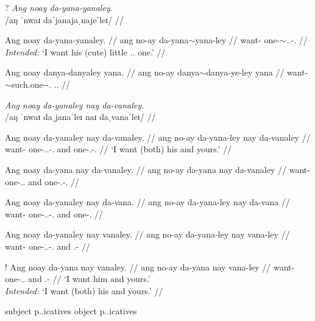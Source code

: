 \documentclass[12pt,a4paper]{scrartcl}
\newcommand{\PargI}{{\Parg}.{\Inan}}
\newcommand{\TsgM}{{\Tsg}.{\M}}
\newcommand{\til}{$\sim$} %
\begin{document}
\pex
\a\ljudge?\begingl
\glpreamble \textit{Ang noay da-yana-yanaley.} \\
	/aŋ ˈnwaɪ daˈjanajaˌnajeˈleɪ/ //

\gla Ang noay da-yana-yanaley. //
\glb ang no-ay da-yana\til{}yana-ley //
\glc \AgtT{} want-\Fsg{} one-\Dim{}\til{}\TsgM{}.\Gen{}-\PargI{} //
\glft \textit{Intended:} `I want his (cute) little \TsgM{}.\Gen{} one.' //
\endgl

\a\ljudge*\begingl
\gla Ang noay danya-danyaley yana. //
\glb ang no-ay danya\til{}danya-ye-ley yana //
\glc \AgtT{} want-\Fsg{} \Dim{}\til{}such.one-\Pl{}-\PargI{} \TsgM{}.\Gen{} //
\endgl

\xe

\pex
\a\begingl
\glpreamble \textit{Ang noay da-yanaley nay da-vanaley.} \\
	/aŋ ˈnwaɪ daˌjanaˈleɪ naɪ daˌvanaˈleɪ/ //

\gla Ang noay da-yanaley nay da-vanaley. //
\glb ang no-ay da-yana-ley nay da-vanaley //
\glc \AgtT{} want-\Fsg{} one-\TsgM{}.\Gen{}-\PargI{} and one-\Ssg{}.\Gen{}-\PargI{} //
\glft `I want (both) his and yours.' //
\endgl

\a\ljudge*\begingl
\gla Ang noay da-yana nay da-vanaley. //
\glb ang no-ay da-yana nay da-vanaley //
\glc \AgtT{} want-\Fsg{} one-\TsgM{}.\Gen{} and one-\Ssg{}.\Gen{}-\PargI{} //
\endgl

\a\ljudge*\begingl
\gla Ang noay da-yanaley nay da-vana. //
\glb ang no-ay da-yana-ley nay da-vana //
\glc \AgtT{} want-\Fsg{} one-\TsgM{}.\Gen{}-\PargI{} and one-\Ssg{}.\Gen{} //
\endgl

\a\ljudge*\begingl
\gla Ang noay da-yanaley nay vanaley. //
\glb ang no-ay da-yana-ley nay vana-ley //
\glc \AgtT{} want-\Fsg{} one-\TsgM{}.\Gen{}-\PargI{} and \Ssg{}.\Gen{}-\Parg{} //
\endgl

\a\ljudge!\begingl
\gla Ang noay da-yana nay vanaley. //
\glb ang no-ay da-yana nay vana-ley //
\glc \AgtT{} want-\Fsg{} one-\TsgM{}.\Gen{} and \Ssg{}.\Gen{}-\Parg{} //
\glft `I want him and yours.' \\
	\textit{Intended:} `I want (both) his and yours.' //
\endgl

\xe

\ex subject p\TsgM{}.\Gen{}icatives \xe
\ex object p\TsgM{}.\Gen{}icatives \xe

\vfill

\begin{multicols}{2}
\printglossary[style=mysuper,type=\leipzigtype]
\end{multicols}
\end{document}
